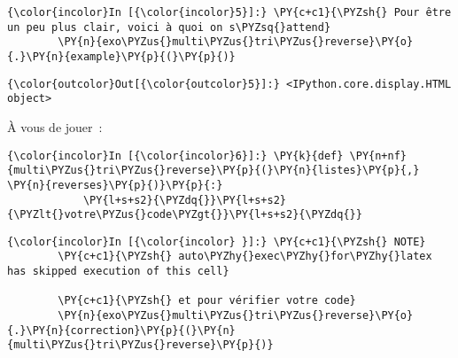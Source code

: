     \begin{Verbatim}[commandchars=\\\{\}]
{\color{incolor}In [{\color{incolor}5}]:} \PY{c+c1}{\PYZsh{} Pour être un peu plus clair, voici à quoi on s\PYZsq{}attend}
        \PY{n}{exo\PYZus{}multi\PYZus{}tri\PYZus{}reverse}\PY{o}{.}\PY{n}{example}\PY{p}{(}\PY{p}{)}
\end{Verbatim}


\begin{Verbatim}[commandchars=\\\{\}]
{\color{outcolor}Out[{\color{outcolor}5}]:} <IPython.core.display.HTML object>
\end{Verbatim}
            
    À vous de jouer~:

    \begin{Verbatim}[commandchars=\\\{\}]
{\color{incolor}In [{\color{incolor}6}]:} \PY{k}{def} \PY{n+nf}{multi\PYZus{}tri\PYZus{}reverse}\PY{p}{(}\PY{n}{listes}\PY{p}{,} \PY{n}{reverses}\PY{p}{)}\PY{p}{:}
            \PY{l+s+s2}{\PYZdq{}}\PY{l+s+s2}{\PYZlt{}votre\PYZus{}code\PYZgt{}}\PY{l+s+s2}{\PYZdq{}}
\end{Verbatim}


    \begin{Verbatim}[commandchars=\\\{\}]
{\color{incolor}In [{\color{incolor} }]:} \PY{c+c1}{\PYZsh{} NOTE}
        \PY{c+c1}{\PYZsh{} auto\PYZhy{}exec\PYZhy{}for\PYZhy{}latex has skipped execution of this cell}
        
        \PY{c+c1}{\PYZsh{} et pour vérifier votre code}
        \PY{n}{exo\PYZus{}multi\PYZus{}tri\PYZus{}reverse}\PY{o}{.}\PY{n}{correction}\PY{p}{(}\PY{n}{multi\PYZus{}tri\PYZus{}reverse}\PY{p}{)}
\end{Verbatim}



    
    
    
